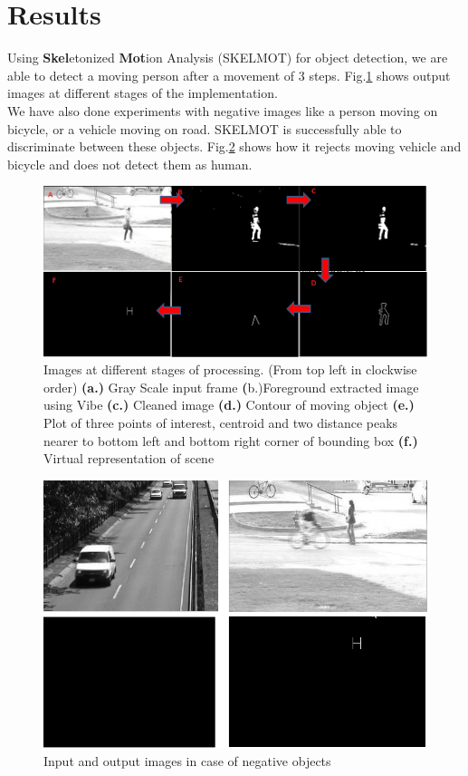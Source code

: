 \documentclass[conference]{IEEEtran}
\begin{document}
\section{Results}
\indent Using \textbf{Skel}etonized \textbf{Mot}ion Analysis
(SKELMOT) for object detection, we are able to detect a moving person
after a movement of 3 steps. Fig.\ref{pipeline_images} shows output
images at different stages of the implementation.\\
\indent We have also done experiments with negative images like a person
moving on bicycle, or a vehicle moving on road. SKELMOT is successfully able
to discriminate between these objects. Fig.\ref{negative_inputs} shows
how it rejects moving vehicle and bicycle and  does not detect them as
human.\\
\begin{figure}[!h]
\centering
\includegraphics[scale=0.30]{figures/pipeline_images}
\caption{Images at different stages of processing. (From top left in
clockwise order) \textbf{(a.)} Gray Scale input frame 
\textbf({b.)}Foreground extracted image using Vibe \textbf{(c.)} Cleaned
image \textbf{(d.)} Contour of moving object \textbf{(e.)} Plot of three points
of interest, centroid and two distance peaks nearer to bottom left and
bottom right corner of bounding box \textbf{(f.)} Virtual representation
of scene} 
\label{pipeline_images}
\end{figure}

\begin{figure}[!h]
\centering
\includegraphics[scale=0.30]{figures/negative_inputs}
\caption{Input and output images in case of negative objects}
\label{negative_inputs}
\end{figure}
\end{document}
